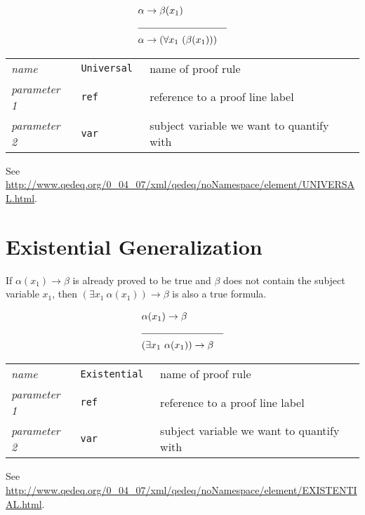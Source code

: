 \documentclass[a4paper,german,10pt,twoside]{book}
\theoremstyle{definition}
\theoremstyle{remark}
\begin{document}
\par
\begin{eqnarray*}
 & \alpha \rightarrow \beta(x_1) & \\
 \cline{2-3}
 & \alpha \rightarrow (\forall x_1~(\beta(x_1))) & \\
\end{eqnarray*}

\par
\begin{tabularx}{\columnwidth}{lll}
  \emph{name}        & \tt{Universal}   & name of proof rule \\
  \emph{parameter 1} & \tt{ref}         & reference to a proof line label \\
  \emph{parameter 2} & \tt{var}         & subject variable we want to quantify with
\end{tabularx}

\par
See \url{http://www.qedeq.org/0_04_07/xml/qedeq/noNamespace/element/UNIVERSAL.html}.

\section{Existential Generalization} \label{chapter6_section8} \hypertarget{chapter6_section8}{}
If $\alpha(x_1) \rightarrow \beta$ is already proved to be true and $\beta$ does not contain the subject variable $x_1$, then $(\exists x_1~\alpha(x_1)) \rightarrow \beta$ is also a true formula.

\par
\begin{eqnarray*}
 & \alpha(x_1) \rightarrow \beta & \\
 \cline{2-3}
 & (\exists x_1~\alpha(x_1)) \rightarrow \beta & \\
\end{eqnarray*}

\par
\begin{tabularx}{\columnwidth}{lll}
  \emph{name}        & \tt{Existential} & name of proof rule \\
  \emph{parameter 1} & \tt{ref}         & reference to a proof line label \\
  \emph{parameter 2} & \tt{var}         & subject variable we want to quantify with
\end{tabularx}

\par
See \url{http://www.qedeq.org/0_04_07/xml/qedeq/noNamespace/element/EXISTENTIAL.html}.
\end{document}

